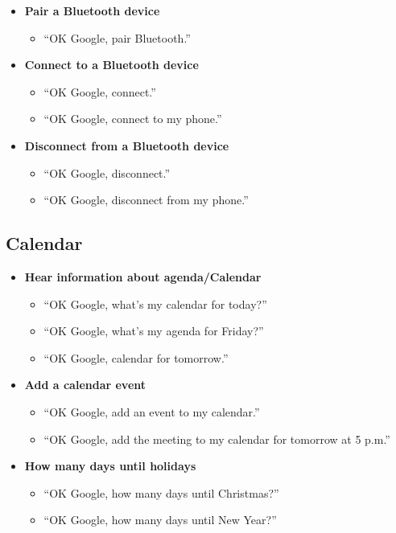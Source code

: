 \documentclass[
  jou,
  floatsintext,
  longtable,
  a4paper,
  nolmodern,
  notxfonts,
  notimes,
  12pt,
  colorlinks=true,linkcolor=blue,citecolor=blue,urlcolor=blue]{apa7}
\providecommand{\tightlist}{%
  \setlength{\itemsep}{0pt}\setlength{\parskip}{0pt}}
\begin{document}
\begin{itemize}
\tightlist
\item
  \textbf{Pair a Bluetooth device}

  \begin{itemize}
  \tightlist
  \item
    ``OK Google, pair Bluetooth.''
  \end{itemize}
\item
  \textbf{Connect to a Bluetooth device}

  \begin{itemize}
  \tightlist
  \item
    ``OK Google, connect.''
  \item
    ``OK Google, connect to my phone.''
  \end{itemize}
\item
  \textbf{Disconnect from a Bluetooth device}

  \begin{itemize}
  \tightlist
  \item
    ``OK Google, disconnect.''
  \item
    ``OK Google, disconnect from my phone.''
  \end{itemize}
\end{itemize}

\subsection{Calendar}\label{calendar}

\begin{itemize}
\tightlist
\item
  \textbf{Hear information about agenda/Calendar}

  \begin{itemize}
  \tightlist
  \item
    ``OK Google, what's my calendar for today?''
  \item
    ``OK Google, what's my agenda for Friday?''
  \item
    ``OK Google, calendar for tomorrow.''
  \end{itemize}
\item
  \textbf{Add a calendar event}

  \begin{itemize}
  \tightlist
  \item
    ``OK Google, add an event to my calendar.''
  \item
    ``OK Google, add the meeting to my calendar for tomorrow at 5 p.m.''
  \end{itemize}
\item
  \textbf{How many days until holidays}

  \begin{itemize}
  \tightlist
  \item
    ``OK Google, how many days until Christmas?''
  \item
    ``OK Google, how many days until New Year?''
  \end{itemize}
\end{itemize}
\end{document}
